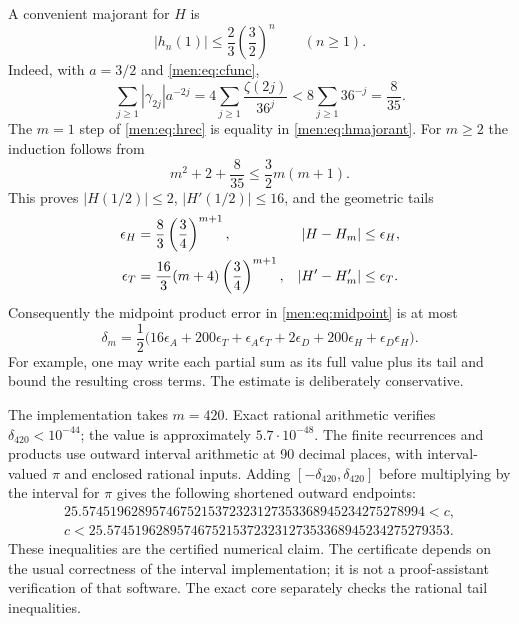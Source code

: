 \documentclass[11pt,letterpaper]{article}
\theoremstyle{remark}\newtheorem{remark}[theorem]{Remark}
\begin{document}
A convenient majorant for $H$ is
\begin{equation}\label{men:eq:hmajorant}
 |h_n(1)|\le\frac23\left(\frac32\right)^n\qquad(n\ge1).
\end{equation}
Indeed, with $a=3/2$ and \eqref{men:eq:cfunc},
\[
 \sum_{j\ge1}|\gamma_{2j}|a^{-2j}
 =4\sum_{j\ge1}\frac{\zeta(2j)}{36^j}
 <8\sum_{j\ge1}36^{-j}=\frac8{35}.
\]
The $m=1$ step of \eqref{men:eq:hrec} is equality in \eqref{men:eq:hmajorant}. For $m\ge2$ the induction follows from
\[
 m^2+2+\frac8{35}\le\frac32m(m+1).
\]
This proves $|H(1/2)|\le2$, $|H'(1/2)|\le16$, and the geometric tails
\begin{align}
 \epsilon_H&=\frac83\left(\frac34\right)^{m+1},&
 |H-H_m|&\le\epsilon_H,\notag\\
 \epsilon_T&=\frac{16}3(m+4)\left(\frac34\right)^{m+1},&
 |H'-H_m'|&\le\epsilon_T.\label{men:eq:Htails}
\end{align}
Consequently the midpoint product error in \eqref{men:eq:midpoint} is at most
\begin{equation}\label{men:eq:delta}
 \delta_m=\frac12\bigl(16\epsilon_A+200\epsilon_T+\epsilon_A\epsilon_T
 +2\epsilon_D+200\epsilon_H+\epsilon_D\epsilon_H\bigr).
\end{equation}
For example, one may write each partial sum as its full value plus its tail and bound the resulting cross terms. The estimate is deliberately conservative.

The implementation takes $m=420$. Exact rational arithmetic verifies $\delta_{420}<10^{-44}$; the value is approximately $5.7\cdot10^{-48}$. The finite recurrences and products use outward interval arithmetic at 90 decimal places, with interval-valued $\pi$ and enclosed rational inputs. Adding $[-\delta_{420},\delta_{420}]$ before multiplying by the interval for $\pi$ gives the following shortened outward endpoints:
\begin{equation}\label{men:eq:certified}
 \begin{gathered}
 25.5745196289574675215372323127353368945234275278994<c,\\
 c<25.5745196289574675215372323127353368945234275279353.
 \end{gathered}
\end{equation}
These inequalities are the certified numerical claim. The certificate depends on the usual correctness of the interval implementation; it is not a proof-assistant verification of that software. The exact core separately checks the rational tail inequalities.
\end{document}
